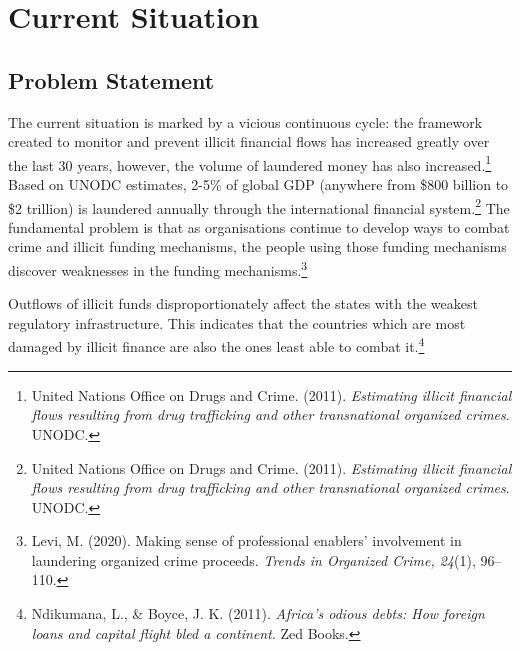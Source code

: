 \section{Current Situation}

\subsection{Problem Statement}

The current situation is marked by a vicious continuous cycle: the framework created to monitor and prevent illicit financial flows has increased greatly over the last 30 years, however, the volume of laundered money has also increased.\footnote{United Nations Office on Drugs and Crime. (2011). \emph{Estimating illicit financial flows resulting from drug trafficking and other transnational organized crimes}. UNODC.} Based on UNODC estimates, 2-5\% of global GDP (anywhere from \$800 billion to \$2 trillion) is laundered annually through the international financial system.\footnote{United Nations Office on Drugs and Crime. (2011). \emph{Estimating illicit financial flows resulting from drug trafficking and other transnational organized crimes}. UNODC.} The fundamental problem is that as organisations continue to develop ways to combat crime and illicit funding mechanisms, the people using those funding mechanisms discover weaknesses in the funding mechanisms.\footnote{Levi, M. (2020). Making sense of professional enablers' involvement in laundering organized crime proceeds. \emph{Trends in Organized Crime, 24}(1), 96–110.}

Outflows of illicit funds disproportionately affect the states with the weakest regulatory infrastructure. This indicates that the countries which are most damaged by illicit finance are also the ones least able to combat it.\footnote{Ndikumana, L., \& Boyce, J. K. (2011). \emph{Africa's odious debts: How foreign loans and capital flight bled a continent}. Zed Books.}

